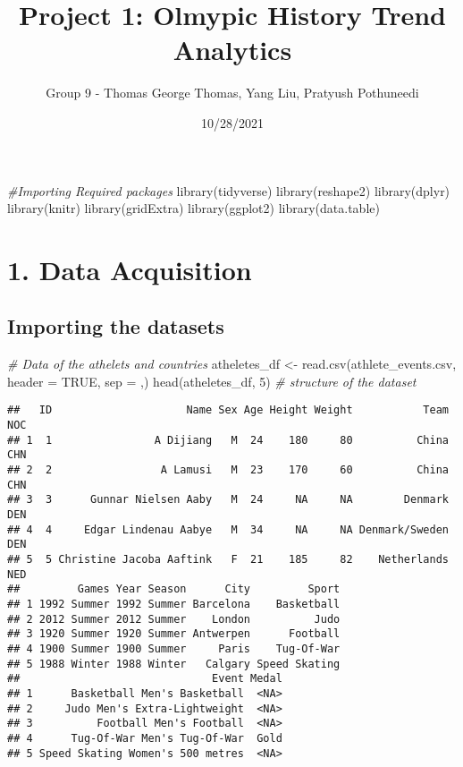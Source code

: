 \documentclass[
]{article}
\title{Project 1: Olmypic History Trend Analytics}
\author{Group 9 - Thomas George Thomas, Yang Liu, Pratyush Pothuneedi}
\date{10/28/2021}
\newenvironment{Shaded}{\begin{snugshade}}{\end{snugshade}}
\newcommand{\AttributeTok}[1]{\textcolor[rgb]{0.77,0.63,0.00}{#1}}
\newcommand{\CommentTok}[1]{\textcolor[rgb]{0.56,0.35,0.01}{\textit{#1}}}
\newcommand{\ConstantTok}[1]{\textcolor[rgb]{0.00,0.00,0.00}{#1}}
\newcommand{\DecValTok}[1]{\textcolor[rgb]{0.00,0.00,0.81}{#1}}
\newcommand{\FunctionTok}[1]{\textcolor[rgb]{0.00,0.00,0.00}{#1}}
\newcommand{\NormalTok}[1]{#1}
\newcommand{\OtherTok}[1]{\textcolor[rgb]{0.56,0.35,0.01}{#1}}
\newcommand{\StringTok}[1]{\textcolor[rgb]{0.31,0.60,0.02}{#1}}
\begin{document}
\maketitle

\begin{Shaded}
\begin{Highlighting}[]
\CommentTok{\#Importing Required packages}
\FunctionTok{library}\NormalTok{(tidyverse)}
\FunctionTok{library}\NormalTok{(reshape2)}
\FunctionTok{library}\NormalTok{(dplyr)}
\FunctionTok{library}\NormalTok{(knitr)}
\FunctionTok{library}\NormalTok{(gridExtra)}
\FunctionTok{library}\NormalTok{(ggplot2)}
\FunctionTok{library}\NormalTok{(data.table)}
\end{Highlighting}
\end{Shaded}

\hypertarget{data-acquisition}{%
\section{1. Data Acquisition}\label{data-acquisition}}

\hypertarget{importing-the-datasets}{%
\subsection{Importing the datasets}\label{importing-the-datasets}}

\begin{Shaded}
\begin{Highlighting}[]
\CommentTok{\# Data of the athelets and countries}
\NormalTok{atheletes\_df }\OtherTok{\textless{}{-}} \FunctionTok{read.csv}\NormalTok{(}\StringTok{\textquotesingle{}athlete\_events.csv\textquotesingle{}}\NormalTok{, }\AttributeTok{header =} \ConstantTok{TRUE}\NormalTok{, }\AttributeTok{sep =} \StringTok{\textquotesingle{},\textquotesingle{}}\NormalTok{)}
\FunctionTok{head}\NormalTok{(atheletes\_df, }\DecValTok{5}\NormalTok{) }\CommentTok{\# structure of the dataset}
\end{Highlighting}
\end{Shaded}

\begin{verbatim}
##   ID                     Name Sex Age Height Weight           Team NOC
## 1  1                A Dijiang   M  24    180     80          China CHN
## 2  2                 A Lamusi   M  23    170     60          China CHN
## 3  3      Gunnar Nielsen Aaby   M  24     NA     NA        Denmark DEN
## 4  4     Edgar Lindenau Aabye   M  34     NA     NA Denmark/Sweden DEN
## 5  5 Christine Jacoba Aaftink   F  21    185     82    Netherlands NED
##         Games Year Season      City         Sport
## 1 1992 Summer 1992 Summer Barcelona    Basketball
## 2 2012 Summer 2012 Summer    London          Judo
## 3 1920 Summer 1920 Summer Antwerpen      Football
## 4 1900 Summer 1900 Summer     Paris    Tug-Of-War
## 5 1988 Winter 1988 Winter   Calgary Speed Skating
##                              Event Medal
## 1      Basketball Men's Basketball  <NA>
## 2     Judo Men's Extra-Lightweight  <NA>
## 3          Football Men's Football  <NA>
## 4      Tug-Of-War Men's Tug-Of-War  Gold
## 5 Speed Skating Women's 500 metres  <NA>
\end{verbatim}
\end{document}
